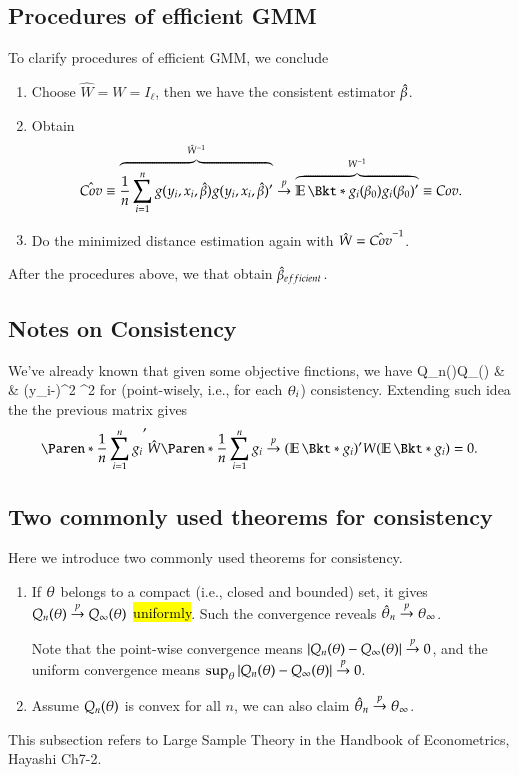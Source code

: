 \documentclass{Theme}
\begin{document}
\subsection{Procedures of efficient GMM}
To clarify procedures of efficient GMM, we conclude 
\begin{enumerate}
\item Choose $\hat{W}=W=I_\ell$, then we have the consistent estimator $\hat{\beta}$.
\item Obtain 
  \[
    \hat{Cov}\equiv\overbrace{\frn\sumn g(y_i,x_i,\hb)g(y_i,x_i,\hb)'}^{\hat{W}\inv}
    \pto \overbrace{\E{g_i(\be_0)g_i(\be_0)'}}^{W\inv}\equiv Cov.
  \]
\item Do the minimized distance estimation again with $\hat{W}=\hat{Cov}^{-1}$.
\end{enumerate}
After the procedures above, we that obtain $\hat{\beta}_{efficient}$.

\subsection{Notes on Consistency}
We've already known that given some objective finctions, we have 
\barc 
Q_n(\theta)\pto Q_\infty(\tht) 
& \tand & 
\frn\sumn(y_i-\hyi)^2 \pto {}^2
\earc 
for (point-wisely, i.e., for each $\theta_i$) consistency. Extending such idea the the previous matrix gives 
\[
  \br{\frn\sumn g_i}'\hat{W}\br{\frn\sumn g_i} \pto (\E{g_i})'W(\E{g_i})=0.
\]

\subsection{Two commonly used theorems for consistency}
Here we introduce two commonly used theorems for consistency.
\begin{enumerate}
\item If $\theta$ belongs to a compact (i.e., closed and bounded) set, 
  it gives $Q_n(\theta)\stackrel{p}{\to} Q_\infty(\theta)$ \hl{uniformly}.
    Such the convergence reveals $\hat{\theta}_n\stackrel{p}{\to}\theta_\infty$.

Note that the point-wise convergence means $|Q_n(\theta)-Q_\infty(\theta)|\stackrel{p}{\to} 0$,
    and the uniform convergence means $\sup_\theta |Q_n(\theta)-Q_\infty(\theta)|\stackrel{p}{\to} 0$.
  \item Assume $Q_n(\theta)$ is convex for all $n$,
    we can also claim $\hat{\theta}_n\stackrel{p}{\to} \theta_\infty$.
\end{enumerate}
This subsection refers to Large Sample Theory in the Handbook of Econometrics, Hayashi Ch7-2.
\end{document}
